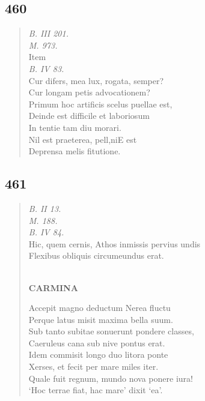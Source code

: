 \documentclass[11pt, a4paper]{report}
\begin{document}
            \subsection*{460}
      \begin{verse}
      \textit{B. III 201.} \\ \textit{M. 973.} \\  \lbrack Item \rbrack  \\ \textit{B. IV 83.} \\ Cur difers, mea lux, rogata, semper? \\ Cur longam petis advocationem? \\ Primum hoc artificis scelus puellae est, \\ Deinde est difficile et laboriosum \\ In tentie tam diu morari. \\ Nil est praeterea, pell,niE est \\ Deprensa melis fitutione. \\ 
      \end{verse}
  
            \subsection*{461}
      \begin{verse}
      \textit{B. II 13.} \\ \textit{M. 188.} \\ \textit{B. IV 84.} \\ Hic, quem cernis, Athos inmissis pervius undis \\ Flexibus obliquis circumeundus erat. \\ 
        ﻿\pagebreak 
    \begin{center} \textbf{CARMINA} \end{center} \marginpar{[340]} Accepit magno deductum Nerea fluctu \\ Perque latus misit maxima bella suum. \\ Sub tanto subitae sonuerunt pondere classes, \\ Caeruleus cana sub nive pontus erat. \\ Idem commisit longo duo litora ponte \\ Xerses, et fecit per mare miles iter. \\ Quale fuit regnum, mundo nova ponere iura! \\ ‘Hoc terrae fiat, hac mare’ dixit ‘ea’. \\ 
      \end{verse}
  
\end{document}
